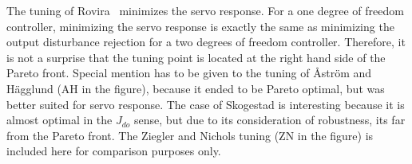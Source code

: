 The tuning of Rovira~\cite{Rovira1969} minimizes the servo response. For a one degree of freedom controller, minimizing the servo response is exactly the same as minimizing the output disturbance rejection for a two degrees of freedom controller. Therefore, it is not a surprise that the tuning point is located at the right hand side of the Pareto front. Special mention has to be given to the tuning of {\AA}ström and Hägglund \cite{Astrom1995} (AH in the figure), because it ended to be Pareto optimal, but was better suited for servo response. The case of Skogestad \cite{Grimholt2012} is interesting because it is almost optimal in the $J_{do}$ sense, but due to its consideration of robustness, its far from the Pareto front. The Ziegler and Nichols tuning \cite{Ziegler1942} (ZN in the figure) is included here for comparison purposes only.

